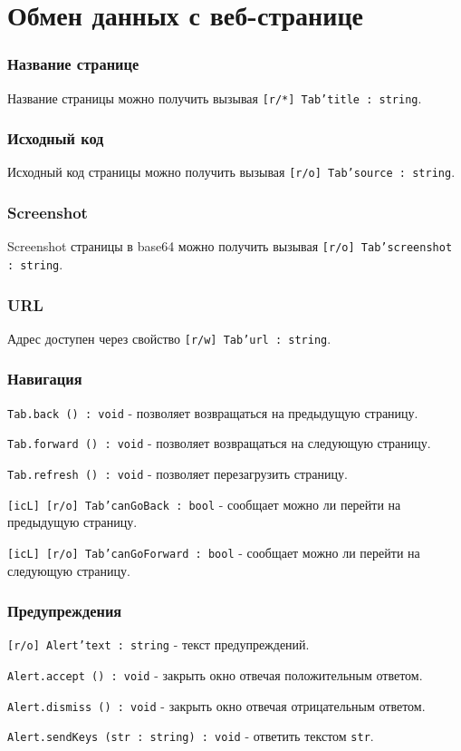 \section{Обмен данных с веб-странице}
\label{dataexchange}

\subsubsection{Название странице}

Название страницы можно получить вызывая \texttt{[r/*] Tab'title : string}.

\subsubsection{Исходный код}

Исходный код страницы можно получить вызывая \texttt{[r/o] Tab'source : string}.

\subsubsection{Screenshot}

Screenshot страницы в base64 можно получить вызывая \texttt{[r/o] Tab'screenshot : string}.

\subsubsection{URL}

Адрес доступен через свойство \texttt{[r/w] Tab'url : string}.

\subsubsection{Навигация}

\texttt{Tab.back () : void} - позволяет возвращаться на предыдущую страницу.

\texttt{Tab.forward () : void} - позволяет возвращаться на следующую страницу.

\texttt{Tab.refresh () : void} -  позволяет перезагрузить страницу.

\texttt{[icL] [r/o] Tab'canGoBack : bool} - сообщает можно ли перейти на предыдущую страницу.

\texttt{[icL] [r/o] Tab'canGoForward : bool} - сообщает можно ли перейти на следующую страницу.


\subsubsection{Предупреждения}

\texttt{[r/o] Alert'text : string} - текст предупреждений.

\texttt{Alert.accept () : void} - закрыть окно отвечая положительным ответом.

\texttt{Alert.dismiss () : void} - закрыть окно отвечая отрицательным ответом.

\texttt{Alert.sendKeys (str : string) : void} - ответить текстом \texttt{str}.

